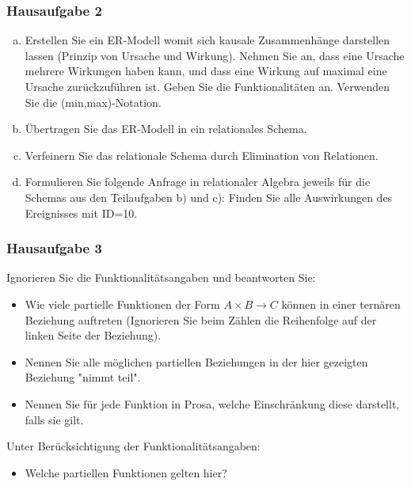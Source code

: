 \begin{frame}
	\frametitle{Hausaufgabe 2}
	\vspace{0.5cm}

	\begin{enumerate}[a)]
		\item Erstellen Sie ein ER-Modell womit sich kausale Zusammenhänge
		      darstellen lassen (Prinzip von Ursache und Wirkung).
		      Nehmen Sie an, dass eine Ursache mehrere Wirkungen haben kann,
		      und dass eine Wirkung auf maximal eine Ursache zurückzuführen ist.
		      Geben Sie die Funktionalitäten an. Verwenden Sie die (min,max)-Notation.
		\item Übertragen Sie das ER-Modell in ein relationales Schema.
		\item Verfeinern Sie das relationale Schema durch Elimination von Relationen.
		\item Formulieren Sie folgende Anfrage in relationaler Algebra jeweils für die Schemas
		      aus den Teilaufgaben b) und c): Finden Sie alle Auswirkungen des Ereignisses mit ID=10.
	\end{enumerate}
\end{frame}

\begin{frame}
	\frametitle{Hausaufgabe 3}
	\vspace{0.5cm}

	Ignorieren Sie die Funktionalitätsangaben und beantworten Sie:
	\begin{itemize}
		\item Wie viele partielle Funktionen der Form \( A \times B \rightarrow C \)
		      können in einer ternären Beziehung auftreten
		      (Ignorieren Sie beim Zählen die Reihenfolge auf der linken Seite der Beziehung).
		\item Nennen Sie alle möglichen partiellen Beziehungen in der hier
		      gezeigten Beziehung "nimmt teil".
		\item Nennen Sie für jede Funktion in Prosa,
		      welche Einschränkung diese darstellt, falls sie gilt.
	\end{itemize}
	Unter Berücksichtigung der Funktionalitätsangaben:
	\begin{itemize}
		\item Welche partiellen Funktionen gelten hier?
	\end{itemize}
\end{frame}

